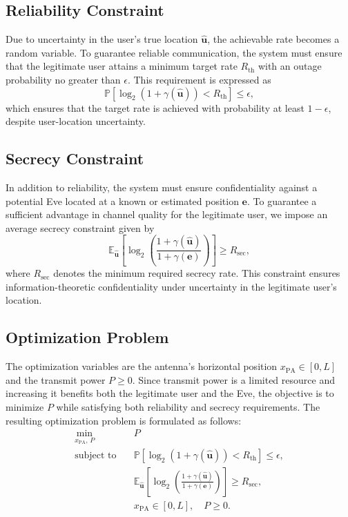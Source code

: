 \documentclass[journal,10pt]{IEEEtran}
\begin{document}
\subsection{Reliability Constraint}
Due to uncertainty in the user’s true location $\hat{\mathbf{u}}$, the achievable rate becomes a random variable. To guarantee reliable communication, the system must ensure that the legitimate user attains a minimum target rate $R_{\mathrm{th}}$ with an outage probability no greater than $\epsilon$. This requirement is expressed as
\begin{equation}
\mathbb{P}\!\left[
\log_2\!\left(1 + \gamma(\hat{\mathbf{u}})\right) < R_{\mathrm{th}}
\right] \leq \epsilon,
\label{eq:robustness_constraint}
\end{equation}
which ensures that the target rate is achieved with probability at least $1-\epsilon$, despite user-location uncertainty.


\subsection{Secrecy Constraint}
In addition to reliability, the system must ensure confidentiality against a potential Eve located at a known or estimated position $\mathbf{e}$. To guarantee a sufficient advantage in channel quality for the legitimate user, we impose an average secrecy constraint given by
\begin{equation}
\mathbb{E}_{\hat{\mathbf{u}}}
\!\left[
\log_2\!\left(
\frac{1 + \gamma(\hat{\mathbf{u}})}
     {1 + \gamma(\mathbf{e})}
\right)
\right]
\geq R_{\mathrm{sec}},
\label{eq:secrecy_constraint}
\end{equation}
where $R_{\mathrm{sec}}$ denotes the minimum required secrecy rate. This constraint ensures information-theoretic confidentiality under uncertainty in the legitimate user’s location.


\subsection{Optimization Problem}

The optimization variables are the antenna’s horizontal position $x_{\mathrm{PA}} \in [0,L]$ and the transmit power $P \geq 0$. Since transmit power is a limited resource and increasing it benefits both the legitimate user and the Eve, the objective is to minimize $P$ while satisfying both reliability and secrecy requirements. The resulting optimization problem is formulated as follows:
\begin{equation}
\begin{aligned}
\min_{x_{\mathrm{PA}},\, P} \quad & P \\
\text{subject to} \quad
& \mathbb{P}\!\left[
\log_2\!\left(1 + \gamma(\hat{\mathbf{u}})\right) < R_{\mathrm{th}}
\right] \leq \epsilon, \\
& \mathbb{E}_{\hat{\mathbf{u}}}
\!\left[
\log_2\!\left(
\frac{1 + \gamma(\hat{\mathbf{u}})}
     {1 + \gamma(\mathbf{e})}
\right)
\right]
\geq R_{\mathrm{sec}}, \\
& x_{\mathrm{PA}} \in [0,L], \quad P \geq 0.
\end{aligned}
\label{eq:optimization_problem}
\end{equation}
\end{document}
